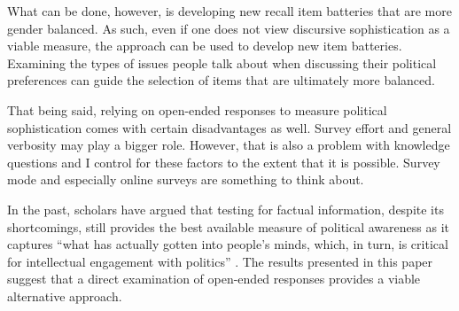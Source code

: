 What can be done, however, is developing new recall item batteries that are more gender balanced. As such, even if one does not view discursive sophistication as a viable measure, the approach can be used to develop new item batteries. Examining the types of issues people talk about when discussing their political preferences can guide the selection of items that are ultimately more balanced.

That being said, relying on open-ended responses to measure political sophistication comes with certain disadvantages as well. Survey effort and general verbosity may play a bigger role. However, that is also a problem with knowledge questions and I control for these factors to the extent that it is possible. Survey mode and especially online surveys are something to think about.


In the past, scholars have argued that testing for factual information, despite its shortcomings, still provides the best available measure of political awareness as it captures ``what has actually gotten into people's minds, which, in turn, is critical for intellectual engagement with politics'' \citet[21]{zaller1992nature}. The results presented in this paper suggest that a direct examination of open-ended responses provides a viable alternative approach.

